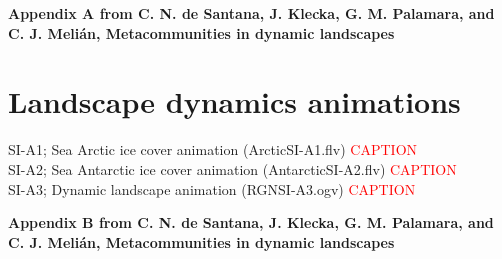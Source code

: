 \documentclass[12pt]{article}
\makeatletter
\newcommand{\carlos}[1]{\textcolor{Red}{#1}}
\renewcommand{\@biblabel}[1]{\quad#1.}
\makeatother
\begin{document}
\appendix
\makeatletter
\renewcommand{\@biblabel}[1]{\quad#1.}
\renewcommand{\thefigure}{S\@arabic\c@figure} 
\makeatother
\pagestyle{myheadings}

\clearpage
\begin{flushleft} 
{\Large \textbf{Appendix A from C. N. de Santana, J. Klecka, G. M. Palamara, and C. J. Meli\'{a}n, Metacommunities in dynamic landscapes}}
\end{flushleft}
\renewcommand{\theequation}{A-\arabic{equation}}
\setcounter{equation}{0}
\renewcommand{\thesection}{A\arabic{section}}
\renewcommand{\thefigure}{A\arabic{figure}}
\renewcommand{\thetable}{A\arabic{table}}
\setcounter{figure}{0}
\setcounter{table}{0}

\section*{Landscape dynamics animations}
SI-A1; Sea Arctic ice cover animation (ArcticSI-A1.flv)
\carlos{CAPTION}
\\
SI-A2; Sea Antarctic ice cover animation (AntarcticSI-A2.flv)
\carlos{CAPTION}
\\
SI-A3; Dynamic landscape animation (RGNSI-A3.ogv)
\carlos{CAPTION}

\clearpage
\begin{flushleft} 
{\Large \textbf{Appendix B from C. N. de Santana, J. Klecka, G. M. Palamara, and C. J. Meli\'{a}n, Metacommunities in dynamic landscapes}}
\end{flushleft}
\renewcommand{\theequation}{B-\arabic{equation}}
\setcounter{equation}{0}
\renewcommand{\thesection}{B\arabic{section}}
\renewcommand{\thefigure}{B\arabic{figure}}
\renewcommand{\thetable}{B\arabic{table}}
\setcounter{figure}{0}
\setcounter{table}{0}
\end{document}
